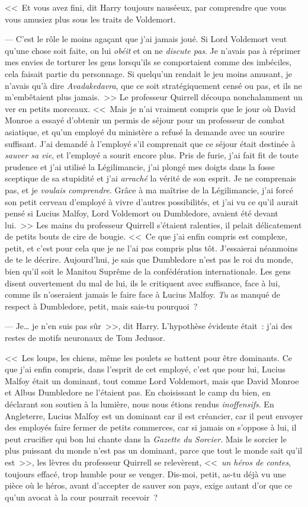 <<~Et vous avez fini, dit Harry toujours nauséeux, par comprendre que vous vous amusiez plus sous les traits de Voldemort.

--- C'est le rôle le moins agaçant que j'ai jamais joué. Si Lord Voldemort veut qu'une chose soit faite, on lui \emph{obéit} et on ne \emph{discute pas}. Je n'avais pas à réprimer mes envies de torturer les gens lorsqu'ils se comportaient comme des imbéciles, cela faisait partie du personnage. Si quelqu'un rendait le jeu moins amusant, je n'avais qu'à dire \emph{Avadakedavra}, que ce soit stratégiquement censé ou pas, et ils ne m'embêtaient plus jamais.~>> Le professeur Quirrell découpa nonchalamment un ver en petits morceaux. <<~Mais je n'ai vraiment compris que le jour où David Monroe a essayé d'obtenir un permis de séjour pour un professeur de combat asiatique, et qu'un employé du ministère a refusé la demande avec un sourire suffisant. J'ai demandé à l'employé s'il comprenait que ce séjour était destinée à \emph{sauver sa vie}, et l'employé a sourit encore plus. Pris de furie, j'ai fait fit de toute prudence et j'ai utilisé la Légilimancie, j'ai plongé mes doigts dans la fosse sceptique de sa stupidité et j'ai \emph{arraché} la vérité de son esprit. Je ne comprenais pas, et je \emph{voulais comprendre}. Grâce à ma maîtrise de la Légilimancie, j'ai forcé son petit cerveau d'employé à vivre d'autres possibilités, et j'ai vu ce qu'il aurait pensé si Lucius Malfoy, Lord Voldemort ou Dumbledore, avaient été devant lui.~>> Les mains du professeur Quirrell s'étaient ralenties, il pelait délicatement de petits bouts de cire de bougie. <<~Ce que j'ai enfin compris est complexe, petit, et c'est pour cela que je ne l'ai pas compris plus tôt. J'essaierai néanmoins de te le décrire. Aujourd'hui, je sais que Dumbledore n'est pas le roi du monde, bien qu'il soit le Manitou Suprême de la confédération internationale. Les gens disent ouvertement du mal de lui, ils le critiquent avec suffisance, face à lui, comme ils n'oseraient jamais le faire face à Lucius Malfoy. \emph{Tu} as manqué de respect à Dumbledore, petit, mais sais-tu pourquoi~?

--- Je… je n'en suis pas sûr~>>, dit Harry. L'hypothèse évidente était~: j'ai des restes de motifs neuronaux de Tom Jedusor.

<<~Les loups, les chiens, même les poulets se battent pour être dominants. Ce que j'ai enfin compris, dans l'esprit de cet employé, c'est que pour lui, Lucius Malfoy était un dominant, tout comme Lord Voldemort, mais que David Monroe et Albus Dumbledore ne l'étaient pas. En choisissant le camp du bien, en déclarant son soutien à la lumière, nous nous étions rendus \emph{inoffensifs}. En Angleterre, Lucius Malfoy est un dominant car il est créancier, car il peut envoyer des employés faire fermer de petits commerces, car si jamais on s'oppose à lui, il peut crucifier qui bon lui chante dans la \emph{Gazette du Sorcier}. Mais le sorcier le plus puissant du monde n'est pas un dominant, parce que tout le monde sait qu'il est~>>, les lèvres du professeur Quirrell se relevèrent, <<~\emph{un héros de contes}, toujours effacé, trop humble pour se venger. Dis-moi, petit, as-tu déjà vu une pièce où le héros, avant d'accepter de sauver son pays, exige autant d'or que ce qu'un avocat à la cour pourrait recevoir~?

